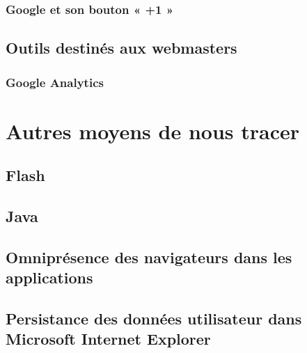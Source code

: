 		\subsubsection{Google et son bouton « +1 »}
			
	\subsection{Outils destinés aux webmasters}
		
		\subsubsection{Google Analytics}
		\label{google_analytics}

\section{Autres moyens de nous tracer}
	\subsection{Flash}
	
	\subsection{Java}
	
	\subsection{Omniprésence des navigateurs dans les applications}
		
	\subsection{Persistance des données utilisateur dans Microsoft Internet Explorer}
		
